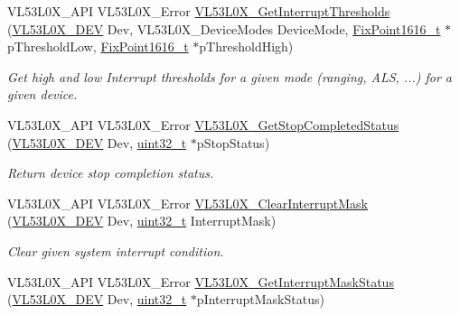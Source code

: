 \begin{DoxyCompactItemize}
V\+L53\+L0\+X\+\_\+\+A\+PI V\+L53\+L0\+X\+\_\+\+Error \hyperlink{group__VL53L0X__interrupt__group_ga9d1025202afa35f30ec8efc1ab42b65d}{V\+L53\+L0\+X\+\_\+\+Get\+Interrupt\+Thresholds} (\hyperlink{group__VL53L0X__platform__group_ga2d6405308b1dd524b462f1b8fb97d167}{V\+L53\+L0\+X\+\_\+\+D\+EV} Dev, V\+L53\+L0\+X\+\_\+\+Device\+Modes Device\+Mode, \hyperlink{vl53l0x__types_8h_afb910790161809fc76e1a274a6349384}{Fix\+Point1616\+\_\+t} $\ast$p\+Threshold\+Low, \hyperlink{vl53l0x__types_8h_afb910790161809fc76e1a274a6349384}{Fix\+Point1616\+\_\+t} $\ast$p\+Threshold\+High)
\begin{DoxyCompactList}\small\item\em Get high and low Interrupt thresholds for a given mode (ranging, A\+LS, ...) for a given device. \end{DoxyCompactList}\item 
V\+L53\+L0\+X\+\_\+\+A\+PI V\+L53\+L0\+X\+\_\+\+Error \hyperlink{group__VL53L0X__interrupt__group_ga63d96c483cd41f1e679d8144603942cf}{V\+L53\+L0\+X\+\_\+\+Get\+Stop\+Completed\+Status} (\hyperlink{group__VL53L0X__platform__group_ga2d6405308b1dd524b462f1b8fb97d167}{V\+L53\+L0\+X\+\_\+\+D\+EV} Dev, \hyperlink{vl53l0x__types_8h_a435d1572bf3f880d55459d9805097f62}{uint32\+\_\+t} $\ast$p\+Stop\+Status)
\begin{DoxyCompactList}\small\item\em Return device stop completion status. \end{DoxyCompactList}\item 
V\+L53\+L0\+X\+\_\+\+A\+PI V\+L53\+L0\+X\+\_\+\+Error \hyperlink{group__VL53L0X__interrupt__group_gaa84b2cf5cd87b118b9a43e7ae764447e}{V\+L53\+L0\+X\+\_\+\+Clear\+Interrupt\+Mask} (\hyperlink{group__VL53L0X__platform__group_ga2d6405308b1dd524b462f1b8fb97d167}{V\+L53\+L0\+X\+\_\+\+D\+EV} Dev, \hyperlink{vl53l0x__types_8h_a435d1572bf3f880d55459d9805097f62}{uint32\+\_\+t} Interrupt\+Mask)
\begin{DoxyCompactList}\small\item\em Clear given system interrupt condition. \end{DoxyCompactList}\item 
V\+L53\+L0\+X\+\_\+\+A\+PI V\+L53\+L0\+X\+\_\+\+Error \hyperlink{group__VL53L0X__interrupt__group_ga8c91d3c30fae1e4c76f6aa3794cab364}{V\+L53\+L0\+X\+\_\+\+Get\+Interrupt\+Mask\+Status} (\hyperlink{group__VL53L0X__platform__group_ga2d6405308b1dd524b462f1b8fb97d167}{V\+L53\+L0\+X\+\_\+\+D\+EV} Dev, \hyperlink{vl53l0x__types_8h_a435d1572bf3f880d55459d9805097f62}{uint32\+\_\+t} $\ast$p\+Interrupt\+Mask\+Status)

\end{DoxyCompactItemize}

